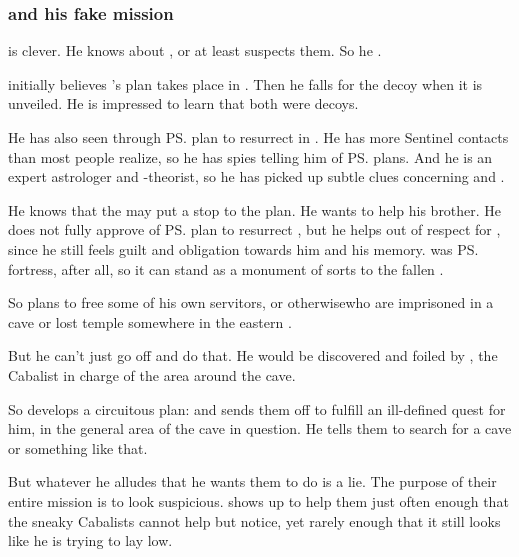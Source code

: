 \subsubsection[Ishnaruchaefir and his fake mission]{\Ishnaruchaefir{} and his fake mission}
\Ishnaruchaefir{} is clever. He knows about , or at least suspects them. So he . 

\Ishnaruchaefir initially believes \Secherdamon's plan takes place in \Malcur.
Then he falls for the \Forclin decoy when it is unveiled. 
He is impressed to learn that both were decoys. 

He has also seen through \ps{\Secherdamon} plan to resurrect \Nithdornazsh{} in \Malcur. 
He has more Sentinel contacts than most people realize, so he has spies telling him of \ps{\Secherdamon} plans. 
And he is an expert astrologer and \matrix-theorist, so he has picked up subtle clues concerning \Nithdornazsh{} and \Malcur. 

He knows that the \noggyaleth{} may put a stop to the plan. 
He wants to help his brother.
He does not fully approve of \ps{\Secherdamon} plan to resurrect \Nithdornazsh, but he helps out of respect for , since he still feels guilt and obligation towards him and his memory. 
\Nithd{} was \ps{\Nexagglachel}{} fortress, after all, so it can stand as a monument of sorts to the fallen \dragonking.

So \Ishnaruchaefir{} plans to free some of his own servitors\dash\pdaemons, \dragons{} or otherwise\dash who are imprisoned in a cave or lost temple somewhere in the eastern \PelidorContinent. 

But he can't just go off and do that. He would be discovered and foiled by , the Cabalist in charge of the area around the cave. 

So \Ishnaruchaefir{} develops a circuitous plan: 
 and sends them off to fulfill an ill-defined quest for him, in the general area of the cave in question. He tells them to search for a cave or something like that. 

But whatever he alludes that he wants them to do is a lie. The purpose of their entire mission is to look suspicious. \Ishnaruchaefir{} shows up to help them just often enough that the sneaky Cabalists cannot help but notice, yet rarely enough that it still looks like he is trying to lay low. 

